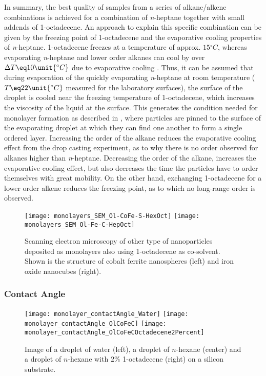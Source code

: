 \documentclass[\main/dresen_thesis.tex]{subfiles}
\begin{document}
    In summary, the best quality of samples from a series of alkane/alkene combinations is achieved for a combination of \textit{n}-heptane together with small addends of 1-octadecene.
    An approach to explain this specific combination can be given by the freezing point of 1-octadecene and the evaporative cooling properties of \textit{n}-heptane.
    1-octadecene freezes at a temperature of approx. $15 \unit{^\circ C}$, whereas evaporating \textit{n}-heptane and lower order alkanes can cool by over $\Delta T \eq 10 \unit{^\circ C}$ due to evaporative cooling \cite{Tuckermann_2002_Evapo}.
    Thus, it can be assumed that during evaporation of the quickly evaporating \textit{n}-heptane at room temperature ($T \eq 22 \unit{^\circ C}$ measured for the laboratory surfaces), the surface of the droplet is cooled near the freezing temperature of 1-octadecene, which increases the viscosity of the liquid at the surface.
    This generates the condition needed for monolayer formation as described in \cite{Bigioni_2006_Kinet}, where particles are pinned to the surface of the evaporating droplet at which they can find one another to form a single ordered layer.
    Increasing the order of the alkane reduces the evaporative cooling effect from the drop casting experiment, as to why there is no order observed for alkanes higher than \textit{n}-heptane.
    Decreasing the order of the alkane, increases the evaporative cooling effect, but also decreases the time the particles have to order themselves with great mobility.
    On the other hand, exchanging 1-octadecene for a lower order alkene reduces the freezing point, as to which no long-range order is observed.

    \begin{figure}[tb]
      \centering
      \texttt{[image: monolayers\_SEM\_Ol-CoFe-S-HexOct]}
      \texttt{[image: monolayers\_SEM\_Ol-Fe-C-HepOct]}
      \caption{\label{fig:monolayers:preparation:solventVariation:spheresIron}Scanning electron microscopy of other type of nanoparticles deposited as monolayers also using 1-octadecene as co-solvent. Shown is the structure of cobalt ferrite nanospheres (left) and iron oxide nanocubes (right).}
    \end{figure}

  \subsubsection{Contact Angle}
    \begin{figure}[tb]
      \centering
      \texttt{[image: monolayer\_contactAngle\_Water]}
      \texttt{[image: monolayer\_contactAngle\_OlCoFeC]}
      \texttt{[image: monolayer\_contactAngle\_OlCoFeCOctadecene2Percent]}
      \caption{\label{fig:monolayers:preparation:contactAngle}Image of a droplet of water (left), a droplet of $\mathit{n}$-hexane (center) and a droplet of $\mathit{n}$-hexane with $2 \unit{\%}$ 1-octadecene (right) on a silicon substrate.}
    \end{figure}
\end{document}

